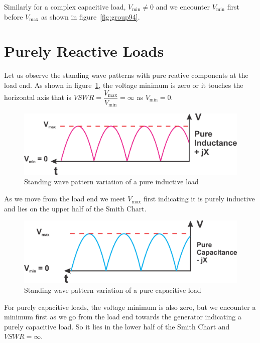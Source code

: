 Similarly for a complex capacitive load, $V_\min\neq0$ and we encounter $V_\min$ first before $V_\max$ as shown in figure~\ref{fig:group94}. 

\section{Purely Reactive Loads}
Let us observe the standing wave patterns with pure reative components at the load end. As shown in figure~\ref{fig:group96}, the voltage minimum is zero or it touches the horizontal axis that is ${VSWR=\dfrac{V_\max}{V_\min}=\infty}$ as ${V_\min=0}$.
\begin{figure}[h]
\centering
\includegraphics[scale=0.5]{./graphics/Group96}
\caption{Standing wave pattern variation of a pure inductive load}
\label{fig:group96}
\end{figure}

As we move from the load end we meet ${V_\max}$ first indicating it is purely inductive and lies on the upper half of the Smith Chart.
\begin{figure}[h]
\centering
\includegraphics[scale=0.5]{./graphics/Group97}
\caption{Standing wave pattern variation of a pure capacitive load}
\label{fig:group97}
\end{figure}

For purely capacitive loads, the voltage minimum is also zero, but we encounter a minimum first as we go from the load end towards the generator indicating a purely capacitive load. So it lies in the lower half of the Smith Chart and $VSWR=\infty$.

